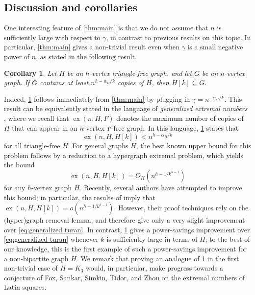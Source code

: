 \documentclass{aic}
\theoremstyle{plain}
\newtheorem{corollary}[theorem]{Corollary}
\theoremstyle{remark}
\DeclareMathOperator\ex{ex}
\begin{document}
\subsection{Discussion and corollaries}
One interesting feature of \cref{thm:main} is that we do not assume that $n$ is sufficiently large with respect to $\gamma$, in contrast to previous results on this topic. In particular, \cref{thm:main} gives a non-trivial result even when $\gamma$ is a small negative power of $n$, as stated in the following result.
\begin{corollary}\label{cor:generalized turan}
    Let $H$ be an $h$-vertex triangle-free graph, and let $G$ be an $n$-vertex graph. If $G$ contains at least $n^{h-\alpha_H/k}$ copies of $H$, then $H[k] \subseteq G$.
\end{corollary}
Indeed, \cref{cor:generalized turan} follows immediately from \cref{thm:main} by plugging in $\gamma = n^{-\alpha_H/k}$. This result can be equivalently stated in the language of \emph{generalized extremal numbers} \cite{MR3548290}, where we recall that $\ex(n, H, F)$ denotes the maximum number of copies of $H$ that can appear in an $n$-vertex $F$-free graph. In this language, \cref{cor:generalized turan} states that $$\ex(n,H,H[k]) < n^{h-\alpha_H/k}$$ for all triangle-free $H$. For general graphs $H$, the best known upper bound for this problem follows by a reduction to a hypergraph extremal problem, which yields the bound
\begin{equation}\label{eq:generalized turan}
\ex(n,H,H[k]) = O_H\left(n^{h - 1/k^{h-1}}\right)
\end{equation}
for any $h$-vertex graph $H$. Recently, several authors \cite{2402.16818,2405.07763,MR4546048} have attempted to improve this bound; in particular, the results of \cite{2402.16818,2405.07763} imply that $\ex(n,H,H[k]) = o(n^{h-1/k^{h-1}})$. However, their proof techniques rely on the (hyper)graph removal lemma, and therefore give only a very slight improvement over \eqref{eq:generalized turan}. In contrast, \cref{cor:generalized turan} gives a power-savings improvement over \eqref{eq:generalized turan} whenever $k$ is sufficiently large in terms of $H$; to the best of our knowledge, this is the first example of such a power-savings improvement for a non-bipartite graph $H$. We remark that proving an analogue of \cref{cor:generalized turan} in the first non-trivial case of $H=K_3$ would, in particular, make progress towards a conjecture of Fox, Sankar, Simkin, Tidor, and Zhou \cite[Conjecture 6.4]{2401.00359} on the extremal numbers of Latin squares. 
\end{document}
